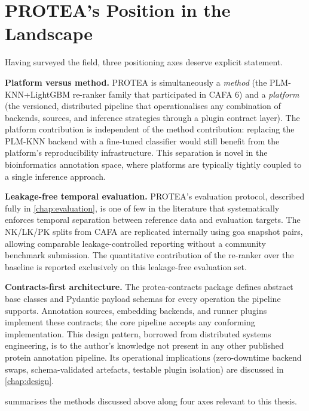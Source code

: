 \section{PROTEA's Position in the Landscape}
\label{sec:related-summary}

Having surveyed the field, three positioning axes deserve explicit statement.

\textbf{Platform versus method.} PROTEA is simultaneously a
\textit{method} (the PLM-KNN+LightGBM re-ranker family that participated in
CAFA 6) and a \textit{platform} (the versioned, distributed pipeline that
operationalises any combination of backends, sources, and inference strategies
through a plugin contract layer). The platform contribution is independent of
the method contribution: replacing the PLM-KNN backend with a fine-tuned
classifier would still benefit from the platform's reproducibility
infrastructure. This separation is novel in the bioinformatics annotation space,
where platforms are typically tightly coupled to a single inference approach.

\textbf{Leakage-free temporal evaluation.} PROTEA's evaluation protocol, described
fully in \cref{chap:evaluation}, is one of few in the literature that
systematically enforces temporal separation between reference data and evaluation
targets. The NK/LK/PK splits from CAFA are replicated internally using
\gls{goa} snapshot pairs, allowing comparable leakage-controlled reporting without
a community benchmark submission. The quantitative contribution of the re-ranker
over the baseline is reported exclusively on this leakage-free evaluation set.

\textbf{Contracts-first architecture.} The protea-contracts package defines
abstract base classes and Pydantic payload schemas for every operation the
pipeline supports. Annotation sources, embedding backends, and runner plugins
implement these contracts; the core pipeline accepts any conforming
implementation. This design pattern, borrowed from distributed systems
engineering, is to the author's knowledge not present in any other published
protein annotation pipeline. Its operational implications (zero-downtime backend
swaps, schema-validated artefacts, testable plugin isolation) are discussed in
\cref{chap:design}.

 summarises the methods discussed above along four
axes relevant to this thesis.

